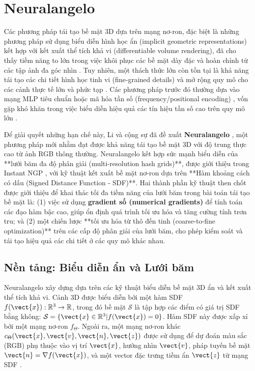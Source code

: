 \section{Neuralangelo}
Các phương pháp tái tạo bề mặt 3D dựa trên mạng nơ-ron, đặc biệt là những phương pháp sử dụng biểu diễn hình học ẩn (implicit geometric representations) kết hợp với kết xuất thể tích khả vi (differentiable volume rendering), đã cho thấy tiềm năng to lớn trong việc khôi phục các bề mặt dày đặc và hoàn chỉnh từ các tập ảnh đa góc nhìn \cite{Wang21NeuS, Yariv21VolSDF, Yariv20IDR}. Tuy nhiên, một thách thức lớn còn tồn tại là khả năng tái tạo các chi tiết hình học tinh vi (fine-grained details) và mở rộng quy mô cho các cảnh thực tế lớn và phức tạp \cite{Li23Neuralangelo}. Các phương pháp trước đó thường dựa vào mạng MLP tiêu chuẩn hoặc mã hóa tần số (frequency/positional encoding) \cite{Mildenhall2020NeRF, Tancik20Fourier}, vốn gặp khó khăn trong việc biểu diễn hiệu quả các tín hiệu tần số cao trên quy mô lớn \cite{Muller22InstantNGP}.

Để giải quyết những hạn chế này, Li và cộng sự đã đề xuất \textbf{Neuralangelo} \cite{Li23Neuralangelo}, một phương pháp mới nhằm đạt được khả năng tái tạo bề mặt 3D với độ trung thực cao từ ảnh RGB thông thường. Neuralangelo kết hợp sức mạnh biểu diễn của **lưới băm đa độ phân giải (multi-resolution hash grids)**, được giới thiệu trong Instant NGP \cite{Muller22InstantNGP}, với kỹ thuật kết xuất bề mặt nơ-ron dựa trên **Hàm khoảng cách có dấu (Signed Distance Function - SDF)**. Hai thành phần kỹ thuật then chốt được giới thiệu để khai thác tối đa tiềm năng của lưới băm trong bài toán tái tạo bề mặt là: (1) việc sử dụng \textbf{gradient số (numerical gradients)} để tính toán các đạo hàm bậc cao, giúp ổn định quá trình tối ưu hóa và tăng cường tính trơn tru; và (2) một chiến lược **tối ưu hóa từ thô đến tinh (coarse-to-fine optimization)** trên các cấp độ phân giải của lưới băm, cho phép kiểm soát và tái tạo hiệu quả các chi tiết ở các quy mô khác nhau.

\subsection{Nền tảng: Biểu diễn ẩn và Lưới băm}
\label{subsec:neuralangelo_background}

Neuralangelo xây dựng dựa trên các kỹ thuật biểu diễn bề mặt 3D ẩn và kết xuất thể tích khả vi. Cảnh 3D được biểu diễn bởi một hàm SDF $f(\vect{x}): \mathbb{R}^3 \rightarrow \mathbb{R}$, trong đó bề mặt $\mathcal{S}$ là tập hợp các điểm có giá trị SDF bằng không: $\mathcal{S} = \{\vect{x} \in \mathbb{R}^3 | f(\vect{x}) = 0\}$. Hàm SDF này được xấp xỉ bởi một mạng nơ-ron $f_\Theta$. Ngoài ra, một mạng nơ-ron khác $c_\Theta(\vect{x}, \vect{v}, \vect{n}, \vect{z})$ được sử dụng để dự đoán màu sắc (RGB) phụ thuộc vào vị trí $\vect{x}$, hướng nhìn $\vect{v}$, pháp tuyến bề mặt $\vect{n} = \nabla f(\vect{x})$, và một vector đặc trưng tiềm ẩn $\vect{z}$ từ mạng SDF \cite{Yariv20IDR}.

